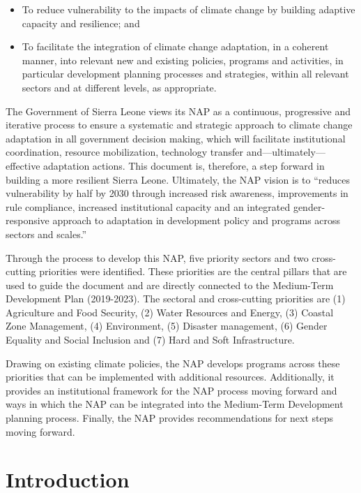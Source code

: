 \documentclass[
]{book}
\providecommand{\tightlist}{%
  \setlength{\itemsep}{0pt}\setlength{\parskip}{0pt}}
\begin{document}
\begin{itemize}
\tightlist
\item
  To reduce vulnerability to the impacts of climate change by building adaptive capacity and resilience; and\\
\item
  To facilitate the integration of climate change adaptation, in a coherent manner, into relevant new and existing policies, programs and activities, in particular development planning processes and strategies, within all relevant sectors and at different levels, as appropriate.
\end{itemize}

The Government of Sierra Leone views its NAP as a continuous, progressive and iterative process to ensure a systematic and strategic approach to climate change adaptation in all government decision making, which will facilitate institutional coordination, resource mobilization, technology transfer and---ultimately---effective adaptation actions. This document is, therefore, a step forward in building a more resilient Sierra Leone. Ultimately, the NAP vision is to ``reduces vulnerability by half by 2030 through increased risk awareness, improvements in rule compliance, increased institutional capacity and an integrated gender-responsive approach to adaptation in development policy and programs across sectors and scales.''

Through the process to develop this NAP, five priority sectors and two cross-cutting priorities were identified. These priorities are the central pillars that are used to guide the document and are directly connected to the Medium-Term Development Plan (2019-2023). The sectoral and cross-cutting priorities are (1) Agriculture and Food Security, (2) Water Resources and Energy, (3) Coastal Zone Management, (4) Environment, (5) Disaster management, (6) Gender Equality and Social Inclusion and (7) Hard and Soft Infrastructure.

Drawing on existing climate policies, the NAP develops programs across these priorities that can be implemented with additional resources. Additionally, it provides an institutional framework for the NAP process moving forward and ways in which the NAP can be integrated into the Medium-Term Development planning process. Finally, the NAP provides recommendations for next steps moving forward.

\hypertarget{introduction}{%
\chapter{Introduction}\label{introduction}}
\end{document}
